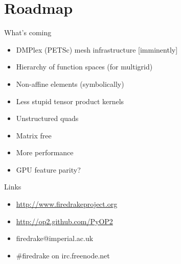 \documentclass[bigger]{beamer}
\begin{document}
\section{Roadmap}
\label{sec:orgheadline28}

\begin{frame}[label={sec:orgheadline26}]{What's coming}
\begin{itemize}
\item DMPlex (PETSc) mesh infrastructure [imminently]
\item Hierarchy of function spaces (for multigrid)
\item Non-affine elements (symbolically)
\item Less stupid tensor product kernels
\item Unstructured quads
\item Matrix free
\item More performance
\item GPU feature parity?
\end{itemize}
\end{frame}

\begin{frame}[label={sec:orgheadline27}]{Links}
\begin{itemize}
\item \url{http://www.firedrakeproject.org}
\item \url{http://op2.github.com/PyOP2}
\item firedrake@imperial.ac.uk
\item \#firedrake on irc.freenode.net
\end{itemize}
\end{frame}
\end{document}
